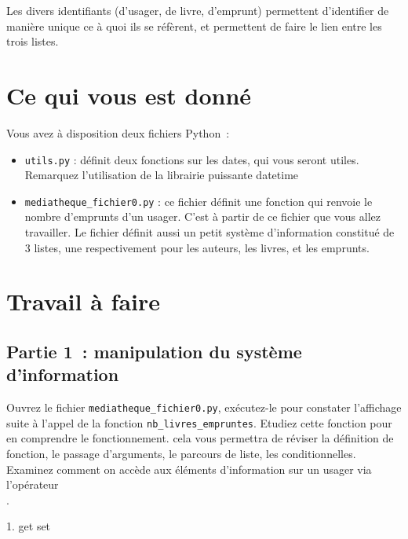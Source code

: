 \documentclass[10pt,a4paper,onecolumn]{article}
\begin{document}
Les divers identifiants (d'usager, de livre, d'emprunt) permettent d'identifier de manière unique ce à quoi ils se réfèrent, et permettent de faire le lien entre les trois listes. 

\section{Ce qui vous est donné}

Vous avez à disposition deux fichiers Python~:

\begin{itemize}
\item \texttt{utils.py} : définit deux fonctions sur les dates, qui vous seront utiles. Remarquez l'utilisation de la librairie puissante datetime
\item \texttt{mediatheque\_fichier0.py} : ce fichier définit une fonction qui renvoie le nombre d'emprunts d'un usager. C'est à partir de ce fichier que vous allez travailler. Le fichier définit aussi un petit système d'information constitué de 3 listes, une respectivement pour les auteurs, les livres, et les emprunts.
\end{itemize}

\section{Travail à faire}


\subsection{Partie 1~: manipulation du système d'information}

Ouvrez le fichier \texttt{mediatheque\_fichier0.py}, exécutez-le pour constater l'affichage suite à l'appel de la fonction \texttt{nb\_livres\_empruntes}. Etudiez cette fonction pour en comprendre le fonctionnement. cela vous permettra de réviser la définition de fonction, le passage d'arguments, le parcours de liste, les conditionnelles. Examinez comment on accède aux éléments d'information sur un usager via l'opérateur \texttt{\[\]}. 






1. get set
\end{document}

